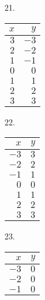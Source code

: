 \documentclass[12pt]{book}
\theoremstyle{definition}
\begin{document}
\begin{multicols}{4}
\begin{enumerate}
\item[21.] \ \\
\begin{tabular}{r|r}
$x$ & $y$\\
\hline
$3$ & $-3$\\
$2$ & $-2$\\
$1$ & $-1$\\
$0$ & $0$\\
$1$ & $1$\\
$2$ & $2$\\
$3$ & $3$
\end{tabular}
\hspace{1in}
\item[22.] \ \\
\begin{tabular}{r|r}
$x$ & $y$\\
\hline
$-3$ & $3$\\
$-2$ & $2$\\
$-1$ & $1$\\
$0$ & $0$\\
$1$ & $1$\\
$2$ & $2$\\
$3$ & $3$
\end{tabular}
\hspace{1in}
\item[23.] \ \\
\begin{tabular}{r|r}
$x$ & $y$\\
\hline
$-3$ & $0$\\
$-2$ & $0$\\
$-1$ & $0$\\

\end{tabular}
\end{enumerate}
\end{multicols}
\end{document}
